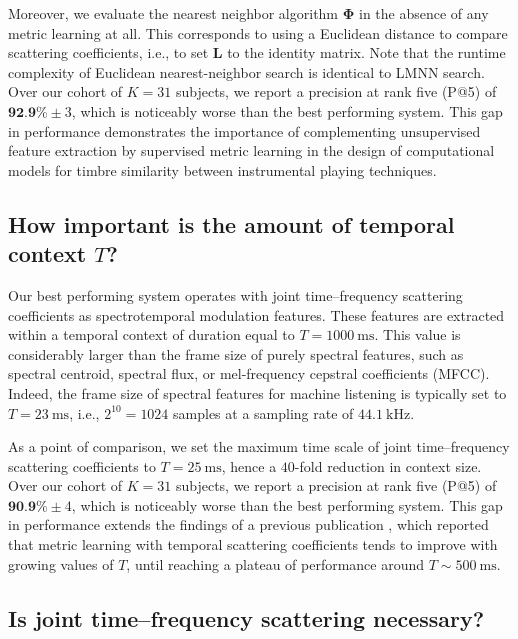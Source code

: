 \documentclass{bmcart}
\begin{document}
Moreover, we evaluate the nearest neighbor algorithm $\mathbf{\Phi}$ in the absence of any metric learning at all.
This corresponds to using a Euclidean distance to compare scattering coefficients, i.e., to set $\mathbf{L}$ to the identity matrix.
Note that the runtime complexity of Euclidean nearest-neighbor search is identical to LMNN search.
Over our cohort of $K=31$ subjects, we report a precision at rank five (P@5) of $\textbf{92.9\%} \pm 3$, which is noticeably worse than the best performing system.
This gap in performance demonstrates the importance of complementing unsupervised feature extraction by supervised metric learning in the design  of computational models for timbre similarity between instrumental playing techniques.


\subsection*{How important is the amount of temporal context $T$?}

Our best performing system operates with joint time--frequency scattering coefficients as spectrotemporal modulation features.
These features are extracted within a temporal context of duration equal to $T=\SI{1000}{\milli\second}$.
This value is considerably larger than the frame size of purely spectral features, such as spectral centroid, spectral flux, or mel-frequency cepstral coefficients (MFCC).
Indeed, the frame size of spectral features for machine listening is typically set to $T=\SI{23}{\milli\second}$, i.e., $2^{10}=1024$ samples at a sampling rate of $\SI{44,1}{\kilo\hertz}$.

As a point of comparison, we set the maximum time scale of joint time--frequency scattering coefficients to $T=\SI{25}{\milli\second}$, hence a $40$-fold reduction in context size.
Over our cohort of $K=31$ subjects, we report a precision at rank five (P@5) of $\textbf{90.9\%} \pm 4$, which is noticeably worse than the best performing system.
This gap in performance extends the findings of a previous publication \cite{lostanlen2018extended}, which reported that metric learning with temporal scattering coefficients tends to improve with growing values of $T$, until reaching a plateau of performance around $T\sim\SI{500}{\milli\second}$.


\subsection*{Is joint time--frequency scattering necessary?}
\end{document}
